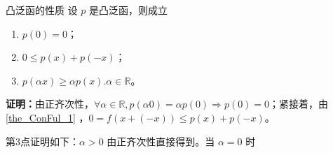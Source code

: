 \begin{theorem}{凸泛函的性质}
设 $p$ 是凸泛函，则成立
\begin{enumerate}
\item $p(0)=0$；
\item $0\leq p(x)+p(-x)$；
\item $p(\alpha x)\geq\alpha p(x).\alpha\in\mathbb R$。
\end{enumerate}
\end{theorem}

\textbf{证明：}由正齐次性，$\forall \alpha\in\mathbb R,p(\alpha 0)=\alpha p(0)\Rightarrow p(0)=0$；紧接着，由\autoref{the_ConFul_1} ，$0=f(x+(-x))\leq p(x)+p(-x)$。

第3点证明如下：$\alpha>0$ 由正齐次性直接得到。当 $\alpha=0$ 时











